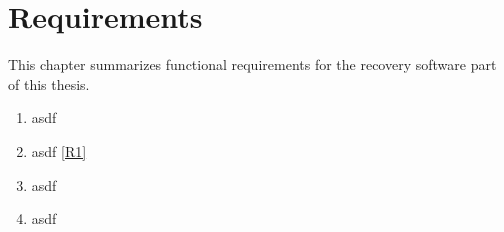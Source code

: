 \chapter{Requirements}
This chapter summarizes functional requirements for the recovery software part of this thesis.

\begin{enumerate}[label=\textbf{R\arabic*},ref=R\arabic*]
\item 
\label{R1}
asdf

\item 
asdf \ref{R1}

\item asdf
\item asdf
\end{enumerate}
